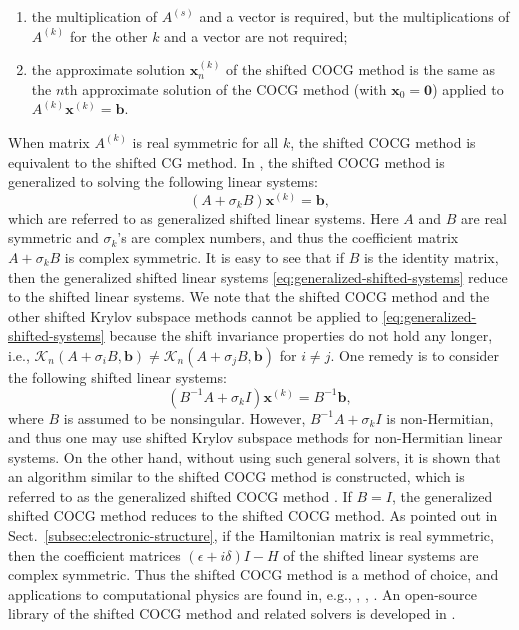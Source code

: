 \begin{enumerate}
\item {the multiplication of $A^{(s)}$ and a vector is required, but the multiplications of $A^{(k)}$ for the other $k$ and a vector are not required;}
\item {the approximate solution $\bm x_n^{(k)}$ of the shifted COCG method is the same as the $n$th approximate solution of the COCG method (with $\bm x_0=\bm0$) applied to $A^{(k)}\bm x^{(k)}=\bm b$.}
\end{enumerate}
{When matrix $A^{(k)}$ is real symmetric for all $k$, the shifted COCG method is equivalent to the shifted CG method.}
{In , the shifted COCG method is generalized to solving the following linear systems:}
\begin{equation}\label{eq:generalized-shifted-systems}(A+\sigma_kB)\bm x^{(k)}=\bm b,\end{equation}
{which are referred to as generalized shifted linear systems. Here $A$ and $B$ are real symmetric and $\sigma_k$'s are complex numbers, and thus the coefficient matrix $A+\sigma_kB$ is complex symmetric. It is easy to see that if $B$ is the identity matrix, then the generalized shifted linear systems \eqref{eq:generalized-shifted-systems} reduce to the shifted linear systems.}
{We note that the shifted COCG method and the other shifted Krylov subspace methods cannot be applied to \eqref{eq:generalized-shifted-systems} because the shift invariance properties do not hold any longer, i.e., $\mathcal K_n(A+\sigma_iB,\bm b)\ne\mathcal K_n(A+\sigma_jB,\bm b)$ for $i\ne j$. One remedy is to consider the following shifted linear systems:}
\[(B^{-1}A+\sigma_k I)\bm x^{(k)}=B^{-1}\bm b,\]
{where $B$ is assumed to be nonsingular. However, $B^{-1}A+\sigma_k I$ is non-Hermitian, and thus one may use shifted Krylov subspace methods for non-Hermitian linear systems. On the other hand, without using such general solvers, it is shown that an algorithm similar to the shifted COCG method is constructed, which is referred to as the generalized shifted COCG method . If $B=I$, the generalized shifted COCG method reduces to the shifted COCG method.}
{As pointed out in Sect.\ \ref{subsec:electronic-structure}, if the Hamiltonian matrix is real symmetric, then the coefficient matrices $(\epsilon+i\delta)I-H$ of the shifted linear systems are complex symmetric. Thus the shifted COCG method is a method of choice, and applications to computational physics are found in, e.g., , , . An open-source library of the shifted COCG method and related solvers is developed in .}
